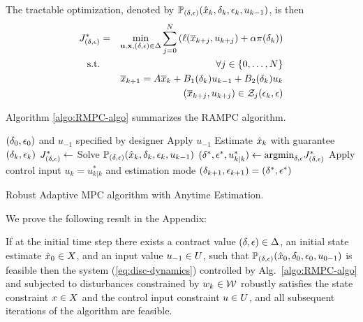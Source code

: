 The tractable optimization, denoted by $\mathbb{P}_{(\delta,\epsilon)}(\hat{x}_{k},\delta_{k},\epsilon_{k},u_{k -1})$, is then 
\begin{eqnarray}
\label{eq:tractableOptim}
J^*_{(\delta,\epsilon)} &=& \min_{\mathbf{u},\mathbf{x},(\delta,\epsilon) \in \Delta}\sum_{j=0}^{N}\left(\ell(\overline{x}_{k+j},u_{k+j})+\alpha\pi(\delta_k)\right)
\\
\textrm{s.t.} &&\forall j \in \{0,\ldots,N\}
\nonumber
\\
&&\overline{x}_{k+1}=A \overline{x}_{k}+B_{1}(\delta_k)u_{k-1}+B_{2}(\delta_k)u_{k}
\nonumber
\\
&& (\overline{x}_{k+j},u_{k+j}) \in \mathcal{Z}_{j}(\epsilon_k,\epsilon)
\nonumber
\end{eqnarray}

Algorithm \ref{algo:RMPC-algo} summarizes the RAMPC algorithm.
\begin{algorithm}
	\begin{algorithmic}[1]
		\State $(\delta_{0},\epsilon_{0})$ and $u_{-1}$ specified by designer
		\State Apply $u_{-1}$
		\State Estimate $\hat{x}_{k}$ with guarantee $\left(\delta_k, \epsilon_k\right)$
		\State $J_{(\delta,\epsilon)}^* \leftarrow $ Solve $\mathbb{P}_{(\delta,\epsilon)}(\hat{x}_{k},\delta_{k},\epsilon_{k},u_{k -1})$		
		\EndFor
		\State $( \delta^{*}, \epsilon^{*}, u_{k | k}^{*} ) \gets \text{argmin}_{\delta,\epsilon} J_{(\delta,\epsilon)}^*$
		\State Apply control input $u_{k} = u_{k | k}^{*}$ and estimation mode $(\delta_{k+1},\epsilon_{k+1}) = \left( \delta^{*}, \epsilon^{*} \right)$
		\EndFor
	\end{algorithmic} 
	
	\caption{Robust Adaptive MPC algorithm with Anytime Estimation.}
	\label{algo:RMPC-algo}
\end{algorithm}

We prove the following result in the Appendix:
\begin{thm}%
	\label{thm:robust-feasible-anytime-RMPC}
	If at the initial time step there exists a contract value $(\delta,\epsilon) \in \Delta$, 
	an initial state estimate $\hat{x}_0 \in X$,
	and an input value $u_{-1} \in U$,
	such that $\mathbb{P}_{(\delta,\epsilon)}(\hat{x}_{0},\delta_{0},\epsilon_{0},u_{0 -1})$
	is feasible then the system (\ref{eq:disc-dynamics}) controlled by
	Alg.~\ref{algo:RMPC-algo} and subjected to disturbances constrained
	by $w_k \in \mathcal{W}$ robustly satisfies the state constraint $x \in X$
	and the control input constraint $u \in U$,
	and all subsequent iterations of the algorithm are feasible.
\end{thm}




